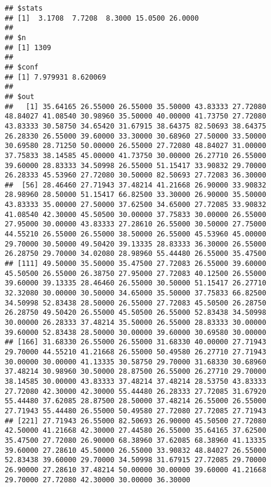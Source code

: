 \documentclass[
]{article}
\begin{document}
\begin{verbatim}
## $stats
## [1]  3.1708  7.7208  8.3000 15.0500 26.0000
## 
## $n
## [1] 1309
## 
## $conf
## [1] 7.979931 8.620069
## 
## $out
##   [1] 35.64165 26.55000 26.55000 35.50000 43.83333 27.72080 48.84027 41.08540 30.98960 35.50000 40.00000 41.73750 27.72080 43.83333 30.58750 34.65420 31.67915 38.64375 82.50693 38.64375 26.28330 26.55000 39.60000 33.30000 30.68960 27.50000 33.50000 30.69580 28.71250 50.00000 26.55000 27.72080 48.84027 31.00000 37.75833 38.14585 45.00000 41.73750 30.00000 26.27710 26.55000 39.60000 28.83333 34.50998 26.55000 51.15417 33.90832 29.70000 26.28333 45.53960 27.72080 30.50000 82.50693 27.72083 36.30000
##  [56] 28.46460 27.71943 37.48214 41.21668 26.90000 33.90832 28.98960 28.50000 51.15417 66.82500 33.30000 26.90000 35.50000 43.83333 35.00000 27.50000 37.62500 34.65000 27.72085 33.90832 41.08540 42.30000 45.50500 30.00000 37.75833 30.00000 26.55000 27.95000 30.00000 43.83333 27.28610 26.55000 30.50000 27.75000 44.55210 26.55000 26.55000 38.50000 26.55000 45.53960 45.00000 29.70000 30.50000 49.50420 39.13335 28.83333 36.30000 26.55000 26.28750 29.70000 34.02080 28.98960 55.44480 26.55000 35.47500
## [111] 49.50000 35.50000 35.47500 27.72083 26.55000 39.60000 45.50500 26.55000 26.38750 27.95000 27.72083 40.12500 26.55000 39.60000 39.13335 28.46460 26.55000 30.50000 51.15417 26.27710 32.32080 30.00000 30.50000 34.65000 35.50000 37.75833 66.82500 34.50998 52.83438 28.50000 26.55000 27.72083 45.50500 26.28750 26.28750 49.50420 26.55000 45.50500 26.55000 52.83438 34.50998 30.00000 26.28333 37.48214 35.50000 26.55000 28.83333 30.00000 39.60000 52.83438 28.50000 30.00000 39.60000 30.69580 30.00000
## [166] 31.68330 26.55000 26.55000 31.68330 40.00000 27.71943 29.70000 44.55210 41.21668 26.55000 50.49580 26.27710 27.71943 30.00000 30.00000 41.13335 30.58750 29.70000 31.68330 30.68960 37.48214 30.98960 30.50000 28.87500 26.55000 26.27710 29.70000 38.14585 30.00000 43.83333 37.48214 37.48214 28.53750 43.83333 27.72080 42.30000 42.30000 55.44480 26.28333 27.72085 31.67920 55.44480 37.62085 28.87500 28.50000 37.48214 26.55000 26.55000 27.71943 55.44480 26.55000 50.49580 27.72080 27.72085 27.71943
## [221] 27.71943 26.55000 82.50693 26.90000 45.50500 27.72080 42.50000 41.21668 42.30000 27.44580 26.55000 35.64165 37.62500 35.47500 27.72080 26.90000 68.38960 37.62085 68.38960 41.13335 39.60000 27.28610 45.50000 26.55000 33.90832 48.84027 26.55000 52.83438 39.60000 29.70000 34.50998 31.67915 27.72085 29.70000 26.90000 27.28610 37.48214 50.00000 30.00000 39.60000 41.21668 29.70000 27.72080 42.30000 30.00000 36.30000
\end{verbatim}
\end{document}
